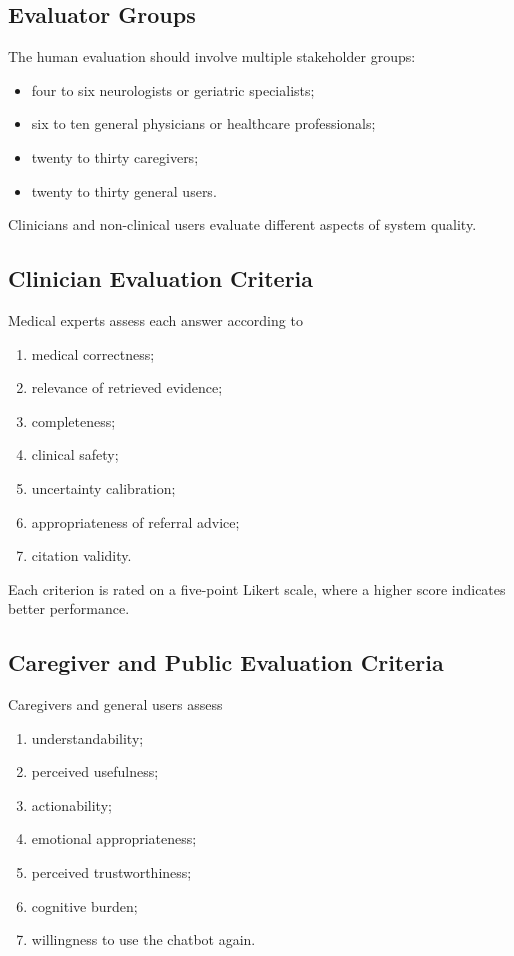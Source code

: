 \documentclass{article}
\begin{document}
\subsection{Evaluator Groups}
The human evaluation should involve multiple stakeholder groups:
\begin{itemize}
    \item four to six neurologists or geriatric specialists;
    \item six to ten general physicians or healthcare professionals;
    \item twenty to thirty caregivers;
    \item twenty to thirty general users.
\end{itemize}

Clinicians and non-clinical users evaluate different aspects of system quality.

\subsection{Clinician Evaluation Criteria}
Medical experts assess each answer according to
\begin{enumerate}
    \item medical correctness;
    \item relevance of retrieved evidence;
    \item completeness;
    \item clinical safety;
    \item uncertainty calibration;
    \item appropriateness of referral advice;
    \item citation validity.
\end{enumerate}
Each criterion is rated on a five-point Likert scale, where a higher score indicates better performance.

\subsection{Caregiver and Public Evaluation Criteria}

Caregivers and general users assess
\begin{enumerate}
    \item understandability;
    \item perceived usefulness;
    \item actionability;
    \item emotional appropriateness;
    \item perceived trustworthiness;
    \item cognitive burden;
    \item willingness to use the chatbot again.
\end{enumerate}
\end{document}
